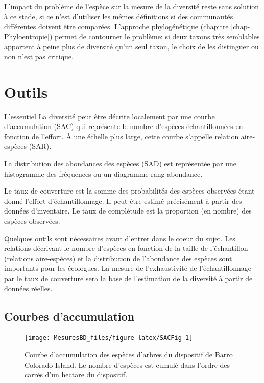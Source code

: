 \documentclass[
  11pt,
  french,
  a4paper,
  extrafontsizes,onecolumn,openright
  ]{memoir}
\newenvironment{Summary}
  {\begin{bclogo}[logo=\bctrombone, noborder=true, couleur=lightgray!50]{L'essentiel}\parindent0pt}
  {\end{bclogo}}
\begin{document}
L'impact du problème de l'espèce sur la mesure de la diversité reste sans solution à ce stade, si ce n'est d'utiliser les mêmes définitions si des communautés différentes doivent être comparées.
L'approche phylogénétique (chapitre \ref{chap-Phyloentropie}) permet de contourner le problème: si deux taxons très semblables apportent à peine plus de diversité qu'un seul taxon, le choix de les distinguer ou non n'est pas critique.

\hypertarget{chap-Outils}{%
\chapter{Outils}\label{chap-Outils}}

\scriptsize

\begin{Summary}
La diversité peut être décrite localement par une courbe d'accumulation
(SAC) qui représente le nombre d'espèces échantillonnées en fonction de
l'effort. À une échelle plus large, cette courbe s'appelle relation
aire-espèces (SAR).

La distribution des abondances des espèces (SAD) est représentée par une
histogramme des fréquences ou un diagramme rang-abondance.

Le taux de couverture est la somme des probabilités des espèces
observées étant donné l'effort d'échantillonnage. Il peut être estimé
précisément à partir des données d'inventaire. Le taux de complétude est
la proportion (en nombre) des espèces observées.
\end{Summary}

\normalsize

Quelques outils sont nécessaires avant d'entrer dans le coeur du sujet.
Les relations décrivant le nombre d'espèces en fonction de la taille de l'échantillon (relations aire-espèces) et la distribution de l'abondance des espèces sont importants pour les écologues.
La mesure de l'exhaustivité de l'échantillonnage par le taux de couverture sera la base de l'estimation de la diversité à partir de données réelles.

\hypertarget{courbes-daccumulation}{%
\section{Courbes d'accumulation}\label{courbes-daccumulation}}



\scriptsize

\begin{figure}

{\centering \texttt{[image: MesuresBD\_files/figure-latex/SACFig-1]} 

}

\caption{Courbe d'accumulation des espèces d'arbres du dispositif de Barro Colorado Island. Le nombre d'espèces est cumulé dans l'ordre des carrés d'un hectare du dispositif.}\label{fig:SACFig}
\end{figure}
\end{document}
